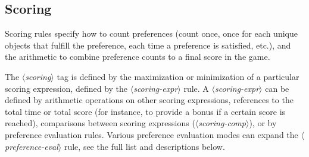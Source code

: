 \documentclass{article}
\newcommand{\dsl}[1]{{\it $\langle$#1$\rangle$}}
\begin{document}
\subsection{Scoring} \label{sec:scoring}
Scoring rules specify how to count preferences (count once, once for each unique objects that fulfill the preference, each time a preference is satisfied, etc.), and the arithmetic to combine preference counts to a final score in the game.

The \dsl{scoring} tag is defined by the maximization or minimization of a particular scoring expression, defined by the \dsl{scoring-expr} rule.
A \dsl{scoring-expr} can be defined by arithmetic operations on other scoring expressions, references to the total time or total score (for instance, to provide a bonus if a certain score is reached), comparisons between scoring expressions (\dsl{scoring-comp}), or by preference evaluation rules.
Various preference evaluation modes can expand the \dsl{preference-eval} rule, see the full list and descriptions below.
        
\end{document}
